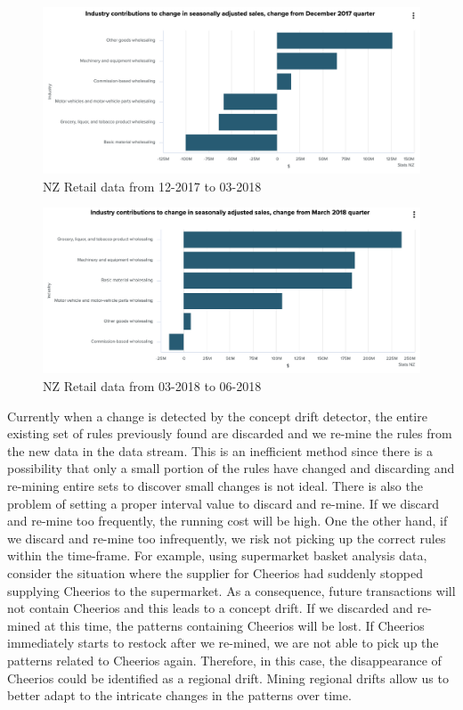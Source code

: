 \begin{figure}[H]
    \centering
    \includegraphics[width=\textwidth]{Introduction/1217to0318.png}
    \caption{NZ Retail data from 12-2017 to 03-2018 \cite{statsnz}}
    \label{fig:retail1}
\end{figure}

\begin{figure}[H]
    \centering
    \includegraphics[width=\textwidth]{Introduction/0318to0618.png}
    \caption{NZ Retail data from 03-2018 to 06-2018 \cite{statsnz}}
    \label{fig:retail2}
\end{figure}




Currently when a change is detected by the concept drift detector, the entire existing set of rules previously found are discarded and we re-mine the rules from the new data in the data stream. This is an inefficient method since there is a possibility that only a small portion of the rules have changed and discarding and re-mining entire sets to discover small changes is not ideal. There is also the problem of setting a proper interval value to discard and re-mine. If we discard and re-mine too frequently, the running cost will be high. One the other hand, if we discard and re-mine too infrequently, we risk not picking up the correct rules within the time-frame. For example, using supermarket basket analysis data, consider the situation where the supplier for Cheerios had suddenly stopped supplying Cheerios to the supermarket. As a consequence, future transactions will not contain Cheerios and this leads to a concept drift. If we discarded and re-mined at this time, the patterns containing Cheerios will be lost. If Cheerios immediately starts to restock after we re-mined, we are not able to pick up the patterns related to Cheerios again. Therefore, in this case, the disappearance of Cheerios could be identified as a regional drift. Mining regional drifts allow us to better adapt to the intricate changes in the patterns over time. 

